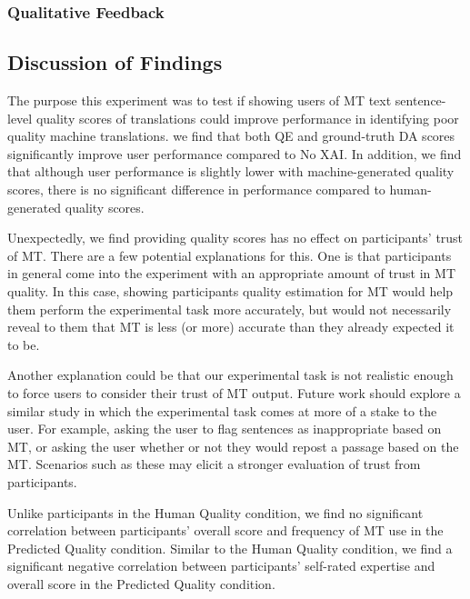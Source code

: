 \subsubsection{Qualitative Feedback}

\subsection{Discussion of Findings} 

The purpose this experiment was to test if showing users of MT text sentence-level quality scores of translations could improve performance in identifying poor quality machine translations. we find that both QE and ground-truth DA scores significantly improve user performance compared to No XAI. 
In addition, we find that although user performance is slightly lower with machine-generated quality scores, there is no significant difference in performance compared to human-generated quality scores. 

Unexpectedly, we find providing quality scores has no effect on participants' trust of MT. There are a few potential explanations for this. One is that participants in general come into the experiment with an appropriate amount of trust in MT quality. In this case, showing participants quality estimation for MT would help them perform the experimental task more accurately, but would not necessarily reveal to them that MT is less (or more) accurate than they already expected it to be. 

Another explanation could be that our experimental task is not realistic enough to force users to consider their trust of MT output. Future work should explore a similar study in which the experimental task comes at more of a stake to the user. For example, asking the user to flag sentences as inappropriate based on MT, or asking the user whether or not they would repost a passage based on the MT. Scenarios such as these may elicit a stronger evaluation of trust from participants.

Unlike participants in the Human Quality condition, we find no significant correlation between participants' overall score and frequency of MT use in the Predicted Quality condition. Similar to the Human Quality condition, we find a significant negative correlation between participants' self-rated expertise and overall score in the Predicted Quality condition.  

